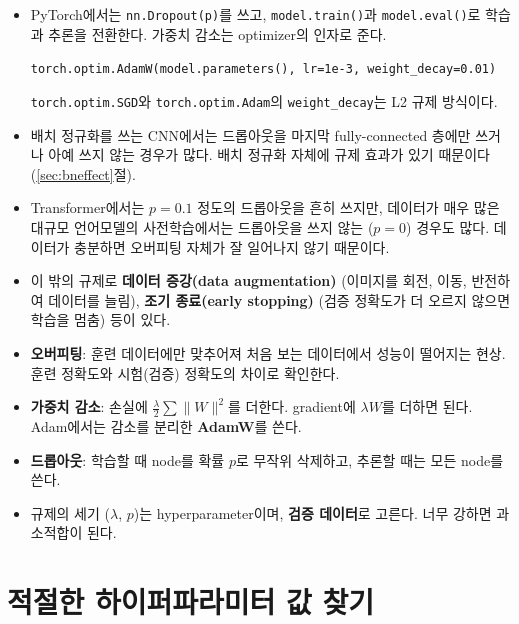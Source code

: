 \documentclass[11pt,a4paper]{article}
\begin{document}
\begin{remarkbox}[실무에서의 규제]
\begin{itemize}[leftmargin=1.5em]
\item PyTorch에서는 \texttt{nn.Dropout(p)}를 쓰고, \texttt{model.train()}과 \texttt{model.eval()}로 학습과 추론을 전환한다.
가중치 감소는 optimizer의 인자로 준다.
\begin{center}
\texttt{torch.optim.AdamW(model.parameters(), lr=1e-3, weight\_decay=0.01)}
\end{center}
\texttt{torch.optim.SGD}와 \texttt{torch.optim.Adam}의 \texttt{weight\_decay}는 L2 규제 방식이다.
\item 배치 정규화를 쓰는 CNN에서는 드롭아웃을 마지막 fully-connected 층에만 쓰거나 아예 쓰지 않는 경우가 많다.
배치 정규화 자체에 규제 효과가 있기 때문이다 (\ref{sec:bneffect}절).
\item Transformer에서는 $p=0.1$ 정도의 드롭아웃을 흔히 쓰지만,
데이터가 매우 많은 대규모 언어모델의 사전학습에서는 드롭아웃을 쓰지 않는 ($p=0$) 경우도 많다.
데이터가 충분하면 오버피팅 자체가 잘 일어나지 않기 때문이다.
\item 이 밖의 규제로 \textbf{데이터 증강(data augmentation)} (이미지를 회전, 이동, 반전하여 데이터를 늘림),
\textbf{조기 종료(early stopping)} (검증 정확도가 더 오르지 않으면 학습을 멈춤) 등이 있다.
\end{itemize}
\end{remarkbox}

\begin{keybox}[바른 학습을 위해: 정리]
\begin{itemize}[leftmargin=1.5em]
\item \textbf{오버피팅}: 훈련 데이터에만 맞추어져 처음 보는 데이터에서 성능이 떨어지는 현상.
훈련 정확도와 시험(검증) 정확도의 차이로 확인한다.
\item \textbf{가중치 감소}: 손실에 $\frac\lambda2\sum\lVert W\rVert^2$를 더한다. gradient에 $\lambda W$를 더하면 된다.
Adam에서는 감소를 분리한 \textbf{AdamW}를 쓴다.
\item \textbf{드롭아웃}: 학습할 때 node를 확률 $p$로 무작위 삭제하고, 추론할 때는 모든 node를 쓴다.
\item 규제의 세기 ($\lambda$, $p$)는 hyperparameter이며, \textbf{검증 데이터}로 고른다.
너무 강하면 과소적합이 된다.
\end{itemize}
\end{keybox}

\section{적절한 하이퍼파라미터 값 찾기}\label{sec:hyper}
\end{document}
